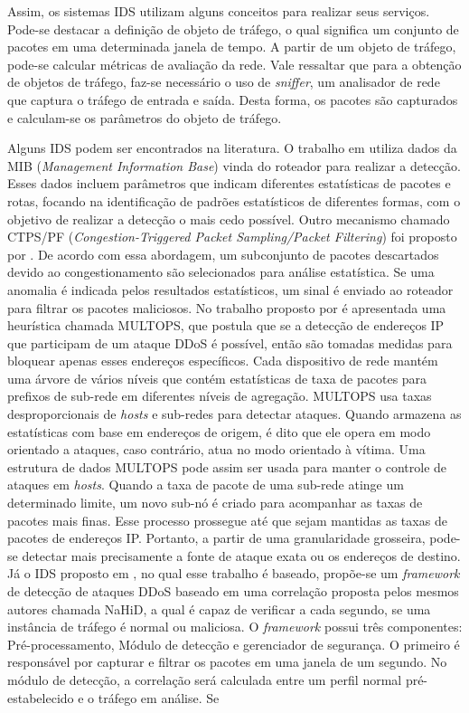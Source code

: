Assim, os sistemas IDS utilizam alguns conceitos para realizar seus serviços. Pode-se destacar a definição de objeto de tráfego, o qual significa um conjunto de pacotes em uma determinada janela de tempo. A partir de um objeto de tráfego, pode-se calcular métricas de avaliação da rede. Vale ressaltar que para a obtenção de objetos de tráfego, faz-se necessário o uso de \textit{sniffer}, um analisador de rede que captura o tráfego de entrada e saída. Desta forma, os pacotes são capturados e calculam-se os parâmetros do objeto de tráfego.

Alguns IDS podem ser encontrados na literatura. O trabalho em \cite{cabrera2001proactive} utiliza dados da MIB (\textit{Management Information Base}) vinda do roteador para realizar a detecção. Esses dados incluem parâmetros que indicam diferentes estatísticas de pacotes e rotas, focando na identificação de padrões estatísticos de diferentes formas, com o objetivo de realizar a detecção o mais cedo possível. Outro mecanismo chamado CTPS/PF (\textit{Congestion-Triggered Packet Sampling/Packet Filtering}) foi proposto por \cite{huang2001countering}. De acordo com essa abordagem, um subconjunto de pacotes descartados devido ao congestionamento são selecionados para análise estatística. Se uma anomalia é indicada pelos resultados estatísticos, um sinal é enviado ao roteador para filtrar os pacotes maliciosos. No trabalho proposto por  é apresentada uma heurística chamada MULTOPS, que postula que se a detecção de endereços IP que participam de um ataque DDoS é possível, então são tomadas medidas para bloquear apenas esses endereços específicos. Cada dispositivo de rede mantém uma árvore de vários níveis que contém estatísticas de taxa de pacotes para prefixos de sub-rede em diferentes níveis de agregação. MULTOPS usa taxas desproporcionais de \textit{hosts} e sub-redes para detectar ataques. Quando armazena as estatísticas com base em endereços de origem, é dito que ele opera em modo orientado a ataques, caso contrário, atua no modo orientado à vítima. Uma estrutura de dados MULTOPS pode assim ser usada para manter o controle de ataques em \textit{hosts}. Quando a taxa de pacote de uma sub-rede atinge um determinado limite, um novo sub-nó é criado para acompanhar as taxas de pacotes mais finas. Esse processo prossegue até que sejam mantidas as taxas de pacotes de endereços IP. Portanto, a partir de uma granularidade grosseira, pode-se detectar mais precisamente a fonte de ataque exata ou os endereços de destino. Já o IDS proposto em , no qual esse trabalho é baseado,  propõe-se um \textit{framework} de detecção de ataques DDoS baseado em uma correlação proposta pelos mesmos autores chamada NaHiD, a qual é capaz de verificar a cada segundo, se uma instância de tráfego é normal ou maliciosa. O \textit{framework} possui três componentes: Pré-processamento, Módulo de detecção e gerenciador de segurança. O primeiro é responsável por capturar e filtrar os pacotes em uma janela de um segundo. No módulo de detecção, a correlação será calculada entre um perfil normal pré-estabelecido e o tráfego  em análise. Se 
